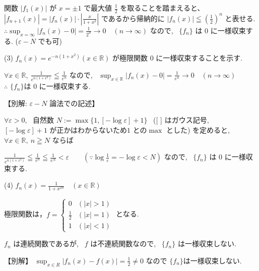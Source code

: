 \documentclass[10pt]{jsarticle}
\begin{document}
関数 $|f_1 (x) |$ が $x= \pm 1$ で最大値 $\displaystyle \frac{1}{2}$ を取ることを踏まえると、 $\left|f_{n+1} (x)\right|=\left|f_{n}(x)\right| \cdot\left|\displaystyle \frac{x}{1+x^{2}}\right|$ であるから帰納的に $\left|f_{n}(x)\right| \leqq\left(\displaystyle \frac{1}{2}\right)^{n}$ と表せる.\\
$\therefore \displaystyle \sup _{x=\infty}\left|f_{n}(x)-0\right|=\frac{1}{2^{n}} \rightarrow 0 \quad (n \to \infty)$ なので, \ $\{f_n\}$ は $0$ に一様収束する. \quad ($\varepsilon - N$ でも可)

\bigskip

\noindent
(3) $f_{n}(x)=e^{-n\left(1+x^{2}\right)}(x \in \mathbb{R})$
が極限関数 $0$ に一様収束することを示す.

$\forall x \in \mathbb{R}, \ \displaystyle \frac{1}{e^{n(1+x^2)}} \leqq \frac{1}{e^n}$ なので, \ 
$\displaystyle \sup _{x \in \mathbb{R}}\left|f_{n}(x)-0\right|=\frac{1}{e^{n}} \rightarrow 0 \quad (n \rightarrow \infty)$\\
$\therefore$ $\{f_n \}$は $0$ に一様収束する.

\bigskip

【別解: $\varepsilon - N$ 論法での記述】

$\forall \varepsilon>0$, \ 自然数 $N:=\max \{1,[-\log \varepsilon]+1\}$ \ 
([ ] はガウス記号, \ $[-\log \varepsilon]+1$ が正かはわからないため$1$ との$\max$ とした)
を定めると, \ $\forall x \in \mathbb{R}, \ n \geqq N$ ならば

$\displaystyle \frac{1}{e^{n(1+x^2)}} \leqq \frac{1}{e^{n}} \leqq \frac{1}{e^{N}}<\varepsilon \qquad
\left(\because \log \frac{1}{\varepsilon}=-\log \varepsilon<N\right)$
なので, \ $\{f_n\}$ は $0$ に一様収束する.

\bigskip

\noindent
(4) $f_{n}(x)= \displaystyle \frac{1}{1+x^{2 n}} \quad(x \in \mathbb{R})$

極限関数は，$f=\left\{\begin{array}{ll}0 & (|x|>1) \\ \frac{1}{2} & (|x|=1) \\ 1 & (|x|<1)\end{array}\right.$ となる.

$f_n$ は連続関数であるが, \ $f$ は不連続関数なので, \ $\{f_n\}$ は一様収束しない.

【別解】
$\displaystyle \sup _{x \in R}\left|f_{n}(x)-f(x)\right|= \displaystyle \frac{1}{2} \neq 0$ なので
$\{f_n\}$は一様収束しない.

\newpage
\end{document}
